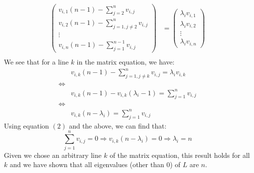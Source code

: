 \documentclass[11pt, legalpaper]{article}
\begin{document}
\begin{enumerate}
\begin{align*}
                \begin{pmatrix}
                    v_{i,1}(n-1)-\sum_{j=2}^{n}v_{i,j} \\ v_{i,2}(n-1)-\sum_{j=1, j\ne 2}^{n}v_{i,j} \\ \vdots \\ v_{i,n}(n-1)-\sum_{j=1}^{n-1}v_{i,j}
                \end{pmatrix} & =\begin{pmatrix}
                    \lambda_i v_{i,1} \\\lambda_i  v_{i,2} \\ \vdots \\ \lambda_i v_{i,n}
                \end{pmatrix} \\
            \end{align*}
            We see that for a line $k$ in the matrix equation, we have:
            \begin{align*}
                &v_{i,k}(n-1)-\sum_{j=1, j\ne k}^{n}v_{i,j}=\lambda_i v_{i,k}\\
                \Longleftrightarrow &\\
                &v_{i,k}(n-1)-v_{i,k}(\lambda_i-1) =\sum_{j=1}^{n}v_{i,j}\\
                \Longleftrightarrow &\\
                &v_{i,k}(n-\lambda_i)=\sum_{j=1}^{n}v_{i,j}
            \end{align*}
            Using equation $(2)$ and the above, we can find that:
            $$\sum_{j=1}^{n}v_{i,j}=0 \Rightarrow v_{i,k}(n-\lambda_i)=0 \Rightarrow \lambda_i=n$$
            Given we chose an arbitrary line $k$ of the matrix equation, this result holds for all $k$ and we have shown that all eigenvalues (other than $0$) of $L$ are $n$.


\end{enumerate}
\end{document}
